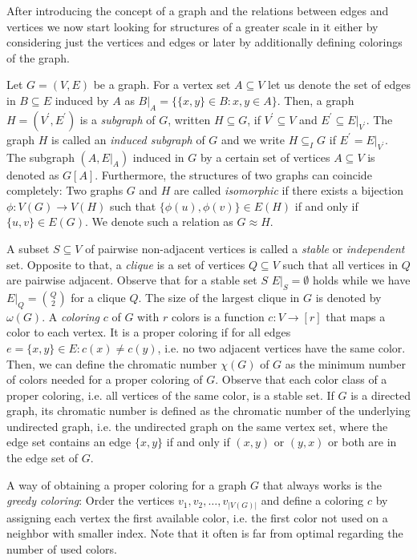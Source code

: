 After introducing the concept of a graph and the relations between edges and vertices we now start looking for structures of a greater scale in it either by considering just the vertices and edges or later by additionally defining colorings of the graph. 

Let $G=(V,E)$ be a graph. For a vertex set $A\subseteq V$ let us denote the set of edges in $B\subseteq E$ induced by $A$ as $B\vert_A=\lbrace \lbrace x,y\rbrace\in B : x,y\in A\rbrace$. Then, a graph $H=(V^\prime ,E^\prime )$ is a \textit{subgraph} of $G$, written $H\subseteq G$, if $V^\prime\subseteq V$ and $E^\prime\subseteq E\vert_{V^\prime}$. The graph $H$ is called an \textit{induced subgraph} of $G$ and we write $H\subseteq_I G$ if $E^\prime = E\vert_{V^\prime}$. The subgraph $(A,E\vert_A)$ induced in $G$ by a certain set of vertices $A\subseteq V$ is denoted as $G[A]$. Furthermore, the structures of two graphs can coincide completely: Two graphs $G$ and $H$ are called \textit{isomorphic} if there exists a bijection $\phi :V(G)\to V(H)$ such that $\lbrace\phi (u), \phi (v)\rbrace\in E(H)$ if and only if $\lbrace u, v\rbrace\in E(G)$. We denote such a relation as $G\approx H$.

A subset $S\subseteq V$ of pairwise non-adjacent vertices is called a \textit{stable} or \textit{independent} set. Opposite to that, a \textit{clique} is a set of vertices $Q\subseteq V$ such that all vertices in $Q$ are pairwise adjacent. Observe that for a stable set $S$ $E\vert_S =\emptyset$ holds while we have $E\vert_Q={Q\choose 2}$ for a clique $Q$. The size of the largest clique in $G$ is denoted by $\omega (G)$. A \textit{coloring} $c$ of $G$ with $r$ colors is a function $c:V\to [r]$ that maps a color to each vertex. It is a proper coloring if for all edges $e = \lbrace x,y\rbrace\in E: c(x)\neq c(y)$, i.e. no two adjacent vertices have the same color. Then, we can define the chromatic number $\chi (G)$ of $G$ as the minimum number of colors needed for a proper coloring of $G$. Observe that each color class of a proper coloring, i.e. all vertices of the same color, is a stable set. If $G$ is a directed graph, its chromatic number is defined as the chromatic number of the underlying undirected graph, i.e. the undirected graph on the same vertex set, where the edge set contains an edge $\{x,y\}$ if and only if $(x,y)$ or $(y,x)$ or both are in the edge set of $G$.

A way of obtaining a proper coloring for a graph $G$ that always works is the \textit{greedy coloring}: Order the vertices $v_1, v_2, \dots ,v_{\vert V(G) \vert }$ and define a coloring $c$ by assigning each vertex the first available color, i.e. the first color not used on a neighbor with smaller index. Note that it often is far from optimal regarding the number of used colors.\\

